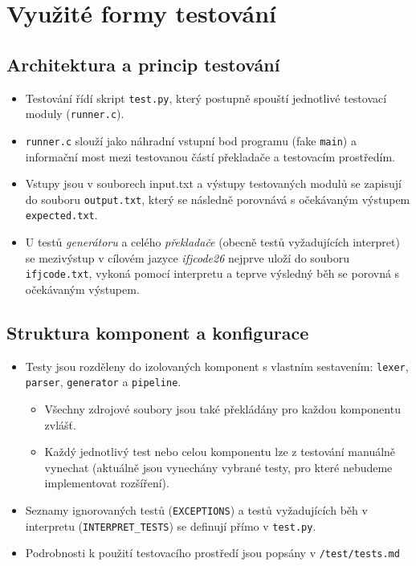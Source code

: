 \documentclass[11pt, a4paper]{article}
\begin{document}
\section{Využité formy testování}

\subsection{Architektura a princip testování}

\begin{itemize}
    \item Testování řídí skript \texttt{test.py}, který postupně spouští jednotlivé testovací moduly (\texttt{runner.c}).
    \item \texttt{runner.c} slouží jako náhradní vstupní bod programu (fake \texttt{main}) a informační most mezi testovanou částí překladače a testovacím prostředím.
    \item Vstupy jsou v souborech input.txt a výstupy testovaných modulů se zapisují do souboru \texttt{output.txt}, který se následně porovnává s očekávaným výstupem \texttt{expected.txt}.
    \item U testů \emph{generátoru} a celého \emph{překladače} (obecně testů vyžadujících interpret) se mezivýstup v cílovém jazyce \emph{ifjcode26} nejprve uloží do souboru \texttt{ifjcode.txt}, vykoná pomocí interpretu a teprve výsledný běh se porovná s očekávaným výstupem.
\end{itemize}

\subsection{Struktura komponent a konfigurace}

\begin{itemize}
    \item Testy jsou rozděleny do izolovaných komponent s vlastním sestavením: \texttt{lexer}, \texttt{parser}, \texttt{generator} a \texttt{pipeline}.
    \begin{itemize}
        \item Všechny zdrojové soubory jsou také překládány pro každou komponentu zvlášť.
        \item Každý jednotlivý test nebo celou komponentu lze z testování manuálně vynechat (aktuálně jsou vynechány vybrané testy, pro které nebudeme implementovat rozšíření).
    \end{itemize}
    \item Seznamy ignorovaných testů (\texttt{EXCEPTIONS}) a testů vyžadujících běh v interpretu (\texttt{INTERPRET\_TESTS}) se definují přímo v \texttt{test.py}.
    \item Podrobnosti k použití testovacího prostředí jsou popsány v \texttt{/test/tests.md}
\end{itemize}
\newpage
\end{document}
